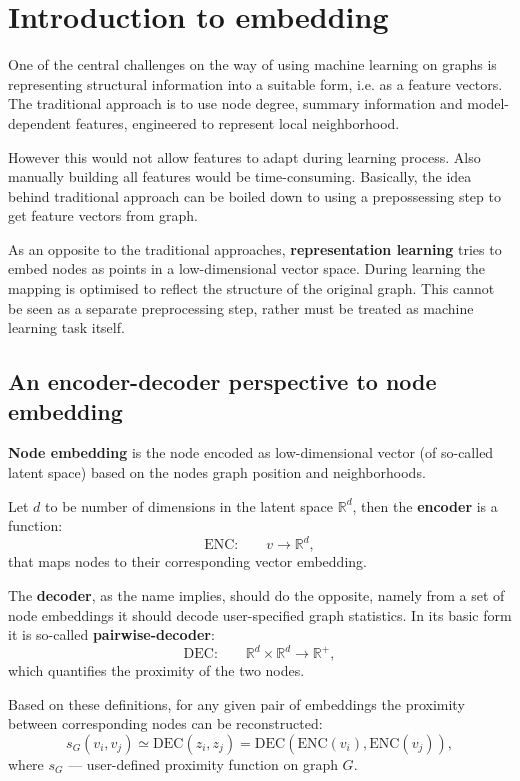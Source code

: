 \section{Introduction to embedding}

One of the central challenges on the way of using machine learning on graphs is representing structural information into a suitable form, i.e. as a feature vectors. The traditional approach is to use node degree, summary information and model-dependent features, engineered to represent local neighborhood. 

However this would not allow features to adapt during learning process. Also manually building all features would be time-consuming. Basically, the idea behind traditional approach can be boiled down to using a prepossessing step to get feature vectors from graph.

As an opposite to the traditional approaches, \textbf{representation learning} tries to embed nodes as points in a low-dimensional vector space. During learning the mapping is optimised to reflect the structure of the original graph. This cannot be seen as a separate preprocessing step, rather must be treated as machine learning task itself.

\subsection{An encoder-decoder perspective to node embedding}

\textbf{Node embedding} is the node encoded as low-dimensional vector (of so-called latent space) based on the nodes graph position and neighborhoods.

Let $d$ to be number of dimensions in the latent space $\mathbb{R}^d$, then the \textbf{encoder} is a function:
$$
\text{ENC:}\qquad v \to \mathbb{R}^d,
$$
that maps nodes to their corresponding vector embedding. 

The \textbf{decoder}, as the name implies, should do the opposite, namely from a set of node embeddings it should decode user-specified graph statistics. In its basic form it is so-called \textbf{pairwise-decoder}:
$$
	\text{DEC:}\qquad \mathbb{R}^d \times \mathbb{R}^d \to \mathbb{R}^{+},
$$
which quantifies the proximity of the two nodes.

Based on these definitions, for any given pair of embeddings the proximity between corresponding nodes can be reconstructed: 
$$
   s_G(v_i, v_j) \simeq \mathrm{DEC}(z_i, z_j) 
     = \mathrm{DEC}(\mathrm{ENC}(v_i), \mathrm{ENC}(v_j)),
$$
where $s_G$ --- user-defined proximity function on graph $G$.


